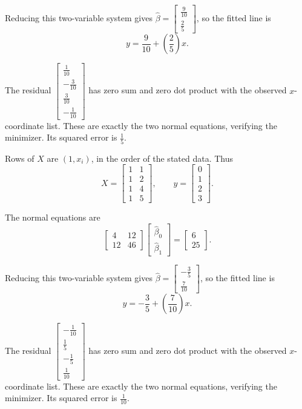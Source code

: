 Reducing this two-variable system gives $\widehat\beta=\begin{bmatrix}\frac{9}{10}\\\frac{2}{5}\end{bmatrix}$, so the fitted line is
\[ \boxed{y=\frac{9}{10}+(\frac{2}{5})x}.\]

The residual $\begin{bmatrix}\frac{1}{10}\\- \frac{3}{10}\\\frac{3}{10}\\- \frac{1}{10}\end{bmatrix}$ has zero sum and zero dot product with the observed $x$-coordinate list. These are exactly the two normal equations, verifying the minimizer. Its squared error is $\frac{1}{5}$.

Rows of $X$ are $(1,x_i)$, in the order of the stated data. Thus
\[ X=\begin{bmatrix}1 & 1\\1 & 2\\1 & 4\\1 & 5\end{bmatrix},\qquad y=\begin{bmatrix}0\\1\\2\\3\end{bmatrix}.\]

The normal equations are
\[ \begin{bmatrix}4 & 12\\12 & 46\end{bmatrix}\begin{bmatrix}\widehat\beta_0\\\widehat\beta_1\end{bmatrix}=\begin{bmatrix}6\\25\end{bmatrix}.\]

Reducing this two-variable system gives $\widehat\beta=\begin{bmatrix}- \frac{3}{5}\\\frac{7}{10}\end{bmatrix}$, so the fitted line is
\[ \boxed{y=- \frac{3}{5}+(\frac{7}{10})x}.\]

The residual $\begin{bmatrix}- \frac{1}{10}\\\frac{1}{5}\\- \frac{1}{5}\\\frac{1}{10}\end{bmatrix}$ has zero sum and zero dot product with the observed $x$-coordinate list. These are exactly the two normal equations, verifying the minimizer. Its squared error is $\frac{1}{10}$.

